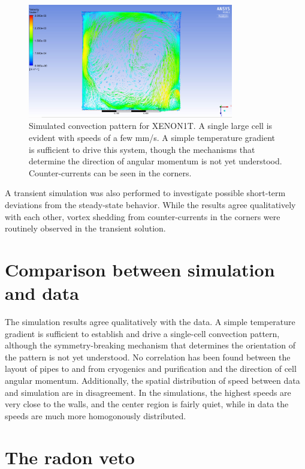 \begin{figure}[htb]
\centering
    \includegraphics[width=0.8\textwidth]{figures/rnveto/convection_sim}
    \caption{Simulated convection pattern for XENON1T. A single large cell is evident with speeds of a few mm/s. A simple temperature gradient is sufficient to drive this system, though the mechanisms that determine the direction of angular momentum is not yet understood. Counter-currents can be seen in the corners.}\label{fig:cfd_sample}
\end{figure}

A transient simulation was also performed to investigate possible short-term deviations from the steady-state behavior. While the results agree qualitatively with each other, vortex shedding from counter-currents in the corners were routinely observed in the transient solution.

\section{Comparison between simulation and data}

The simulation results agree qualitatively with the data. A simple temperature gradient is sufficient to establish and drive a single-cell convection pattern, although the symmetry-breaking mechanism that determines the orientation of the pattern is not yet understood. No correlation has been found between the layout of pipes to and from cryogenics and purification and the direction of cell angular momentum. Additionally, the spatial distribution of speed between data and simulation are in disagreement. In the simulations, the highest speeds are very close to the walls, and the center region is fairly quiet, while in data the speeds are much more homogonously distributed.

\section{The radon veto}~\label{sec:rnveto}

